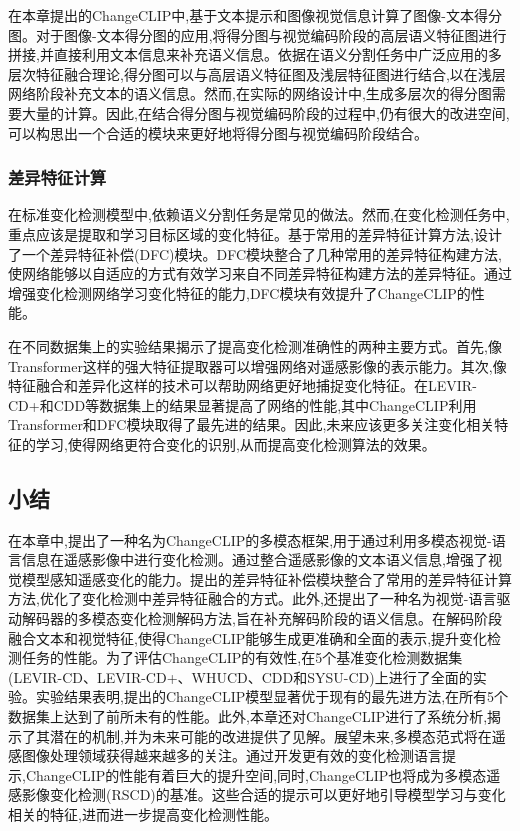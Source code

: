 在本章提出的ChangeCLIP中,基于文本提示和图像视觉信息计算了图像-文本得分图。对于图像-文本得分图的应用,将得分图与视觉编码阶段的高层语义特征图进行拼接,并直接利用文本信息来补充语义信息。依据在语义分割任务中广泛应用的多层次特征融合理论,得分图可以与高层语义特征图及浅层特征图进行结合,以在浅层网络阶段补充文本的语义信息。然而,在实际的网络设计中,生成多层次的得分图需要大量的计算。因此,在结合得分图与视觉编码阶段的过程中,仍有很大的改进空间,可以构思出一个合适的模块来更好地将得分图与视觉编码阶段结合。

\subsubsection{差异特征计算}

在标准变化检测模型中,依赖语义分割任务是常见的做法。然而,在变化检测任务中,重点应该是提取和学习目标区域的变化特征。基于常用的差异特征计算方法,设计了一个差异特征补偿(DFC)模块。DFC模块整合了几种常用的差异特征构建方法,使网络能够以自适应的方式有效学习来自不同差异特征构建方法的差异特征。通过增强变化检测网络学习变化特征的能力,DFC模块有效提升了ChangeCLIP的性能。

在不同数据集上的实验结果揭示了提高变化检测准确性的两种主要方式。首先,像Transformer这样的强大特征提取器可以增强网络对遥感影像的表示能力。其次,像特征融合和差异化这样的技术可以帮助网络更好地捕捉变化特征。在LEVIR-CD+和CDD等数据集上的结果显著提高了网络的性能,其中ChangeCLIP利用Transformer和DFC模块取得了最先进的结果。因此,未来应该更多关注变化相关特征的学习,使得网络更符合变化的识别,从而提高变化检测算法的效果。

\subsection{小结}

在本章中,提出了一种名为ChangeCLIP的多模态框架,用于通过利用多模态视觉-语言信息在遥感影像中进行变化检测。通过整合遥感影像的文本语义信息,增强了视觉模型感知遥感变化的能力。提出的差异特征补偿模块整合了常用的差异特征计算方法,优化了变化检测中差异特征融合的方式。此外,还提出了一种名为视觉-语言驱动解码器的多模态变化检测解码方法,旨在补充解码阶段的语义信息。在解码阶段融合文本和视觉特征,使得ChangeCLIP能够生成更准确和全面的表示,提升变化检测任务的性能。为了评估ChangeCLIP的有效性,在5个基准变化检测数据集(LEVIR-CD、LEVIR-CD+、WHUCD、CDD和SYSU-CD)上进行了全面的实验。实验结果表明,提出的ChangeCLIP模型显著优于现有的最先进方法,在所有5个数据集上达到了前所未有的性能。此外,本章还对ChangeCLIP进行了系统分析,揭示了其潜在的机制,并为未来可能的改进提供了见解。展望未来,多模态范式将在遥感图像处理领域获得越来越多的关注。通过开发更有效的变化检测语言提示,ChangeCLIP的性能有着巨大的提升空间,同时,ChangeCLIP也将成为多模态遥感影像变化检测(RSCD)的基准。这些合适的提示可以更好地引导模型学习与变化相关的特征,进而进一步提高变化检测性能。


